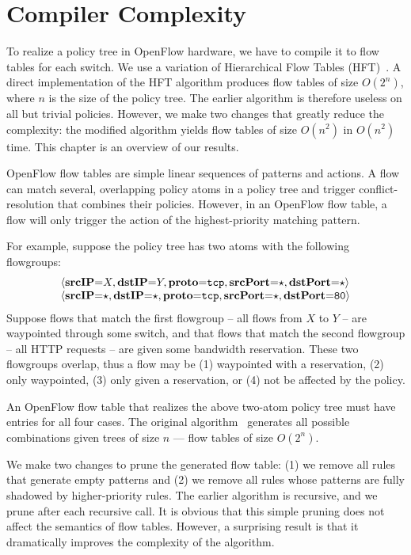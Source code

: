 \section{Compiler Complexity}
\label{sec:compiler-complexity}

To realize a policy tree in OpenFlow hardware, we have to compile it
to flow tables for each switch. We use a variation of
Hierarchical Flow Tables (HFT)~\cite{Ferguson:2012b}. A direct
implementation of the HFT algorithm produces flow tables of size
$O(2^n)$, where $n$ is the size of the policy tree. The earlier
algorithm is therefore useless on all but trivial policies.  However,
we make two changes that greatly reduce the complexity:
the modified algorithm yields flow tables
of size $O(n^2)$ in $O(n^2)$ time. This chapter is an overview of our
results. 

OpenFlow flow tables are simple linear
sequences of patterns and actions. A flow can match several,
overlapping policy atoms in a policy tree and trigger
conflict-resolution that combines their policies. However, in an
OpenFlow flow table, a flow will only trigger the action of the
highest-priority matching pattern.

For example, suppose the policy tree has two atoms with the following
flowgroups:
\[
\begin{array}{l}
\langle\textbf{srcIP}\mathord{=}X,\textbf{dstIP}\mathord{=}Y,\textbf{proto}\mathord{=}\texttt{tcp},\textbf{srcPort}\mathord{=}\star,\textbf{dstPort}\mathord{=}\star\rangle \\
\langle\textbf{srcIP}\mathord{=}\star,\textbf{dstIP}\mathord{=}\star,\textbf{proto}\mathord{=}\texttt{tcp},\textbf{srcPort}\mathord{=}\star,\textbf{dstPort}\mathord{=}\texttt{80}\rangle
\end{array}
\]
Suppose flows that match the first flowgroup -- all flows from $X$ to
$Y$ -- are waypointed through some switch, and that flows that match
the second flowgroup -- all HTTP requests -- are given some bandwidth
reservation.  These two flowgroups overlap, thus a flow may be (1)
waypointed with a reservation, (2) only waypointed, (3) only given a
reservation, or (4) not be affected by the policy.

An OpenFlow flow table that realizes the above two-atom policy tree must have
entries for all four cases.  The original algorithm~\cite{Ferguson:2012b}
generates all possible combinations given trees of size $n$ --- \ie flow tables
of size $O(2^n)$.

We make two changes to prune the generated flow table: (1) we remove
all rules that generate empty patterns and (2) we remove all rules
whose patterns are fully shadowed by higher-priority rules. The
earlier algorithm is recursive, and we prune after each recursive
call.  It is obvious that this simple pruning does not affect the
semantics of flow tables. However, a surprising result is that it
dramatically improves the complexity of the algorithm.

